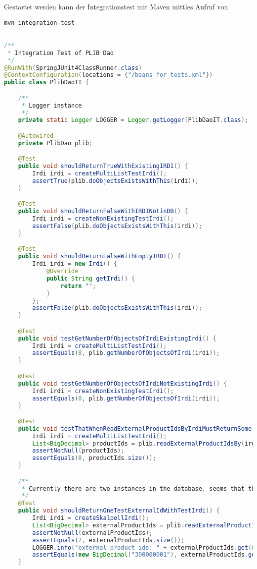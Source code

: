 Gestartet werden kann der Integrationstest mit Maven mittles Aufruf von 

\lstinline[basicstyle=\ttfamily\small\mdseries]{mvn integration-test}

\begin{lstlisting}[caption=Beispiel eines Integrationstests, language=Java, label=lst:integrationstest_beispiel]

/**
 * Integration Test of PLIB Dao
 */
@RunWith(SpringJUnit4ClassRunner.class)
@ContextConfiguration(locations = {"/beans_for_tests.xml"})
public class PlibDaoIT {

    /**
     * Logger instance
     */
    private static Logger LOGGER = Logger.getLogger(PlibDaoIT.class);

    @Autowired
    private PlibDao plib;

    @Test
    public void shouldReturnTrueWithExistingIRDI() {
        Irdi irdi = createMultiListTestIrdi();
        assertTrue(plib.doObjectsExistsWithThis(irdi));
    }

    @Test
    public void shouldReturnFalseWithIRDINotinDB() {
        Irdi irdi = createNonExistingTestIrdi();
        assertFalse(plib.doObjectsExistsWithThis(irdi));
    }

    @Test
    public void shouldReturnFalseWithEmptyIRDI() {
        Irdi irdi = new Irdi() {
            @Override
            public String getIrdi() {
                return "";
            }
        };
        assertFalse(plib.doObjectsExistsWithThis(irdi));
    }

    @Test
    public void testGetNumberOfObjectsOfIrdiExistingIrdi() {
        Irdi irdi = createMultiListTestIrdi();
        assertEquals(8, plib.getNumberOfObjectsOfIrdi(irdi));
    }

    @Test
    public void testGetNumberOfObjectsOfIrdiNotExistingIrdi() {
        Irdi irdi = createNonExistingTestIrdi();
        assertEquals(0, plib.getNumberOfObjectsOfIrdi(irdi));
    }

    @Test
    public void testThatWhenReadExternalProductIdsByIrdiMustReturnSome() throws Exception {
        Irdi irdi = createMultiListTestIrdi();
        List<BigDecimal> productIds = plib.readExternalProductIdsBy(irdi);
        assertNotNull(productIds);
        assertEquals(8, productIds.size());
    }

    /**
     * Currently there are two instances in the database, seems that these are duplicates but not sure.
     */
    @Test
    public void shouldReturnOneTestExternalIdWithTestIrdi() {
        Irdi irdi = createSkalpellIrdi();
        List<BigDecimal> externalProductIds = plib.readExternalProductIdsBy(irdi);
        assertNotNull(externalProductIds);
        assertEquals(2, externalProductIds.size());
        LOGGER.info("external product ids: " + externalProductIds.get(0));
        assertEquals(new BigDecimal("300000001"), externalProductIds.get(0));
    }


\end{lstlisting}
